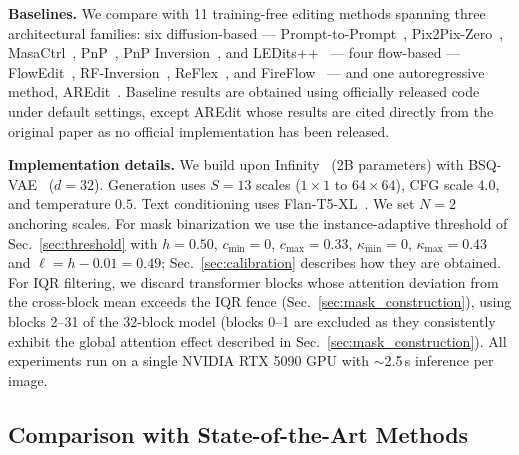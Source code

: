 \noindent\textbf{Baselines.}
We compare with 11 training-free editing methods spanning three architectural families: six diffusion-based --- Prompt-to-Prompt~\cite{prompt2prompt}, Pix2Pix-Zero~\cite{pix2pix-zero}, MasaCtrl~\cite{masactrl}, PnP~\cite{PnP}, PnP Inversion~\cite{PnP_Inversion}, and LEDits++~\cite{LEDits++} --- four flow-based --- FlowEdit~\cite{Flowedit}, RF-Inversion~\cite{RF-inversion}, ReFlex~\cite{ReFlex}, and FireFlow~\cite{FireFlow} --- and one autoregressive method, AREdit~\cite{AREdit}. Baseline results are obtained using officially released code under default settings, except AREdit whose results are cited directly from the original paper as no official implementation has been released.

\noindent\textbf{Implementation details.}
We build upon Infinity~\cite{Infinity} (2B parameters) with BSQ-VAE~\cite{BSQVAE} ($d{=}32$). Generation uses $S{=}13$ scales ($1{\times}1$ to $64{\times}64$), CFG scale 4.0, and temperature $0.5$. Text conditioning uses Flan-T5-XL~\cite{flan-t5}. We set $N{=}2$ anchoring scales. For mask binarization we use the instance-adaptive threshold of Sec.~\ref{sec:threshold} with $h{=}0.50$, $c_{\min}{=}0$, $c_{\max}{=}0.33$, $\kappa_{\min}{=}0$, $\kappa_{\max}{=}0.43$ and $\ell = h - 0.01 = 0.49$; Sec.~\ref{sec:calibration} describes how they are obtained. For IQR filtering, we discard transformer blocks whose attention deviation from the cross-block mean exceeds the IQR fence (Sec.~\ref{sec:mask_construction}), using blocks 2--31 of the 32-block model (blocks 0--1 are excluded as they consistently exhibit the global attention effect described in Sec.~\ref{sec:mask_construction}). All experiments run on a single NVIDIA RTX 5090 GPU with ${\sim}$2.5\,s inference per image.

\subsection{Comparison with State-of-the-Art Methods}

